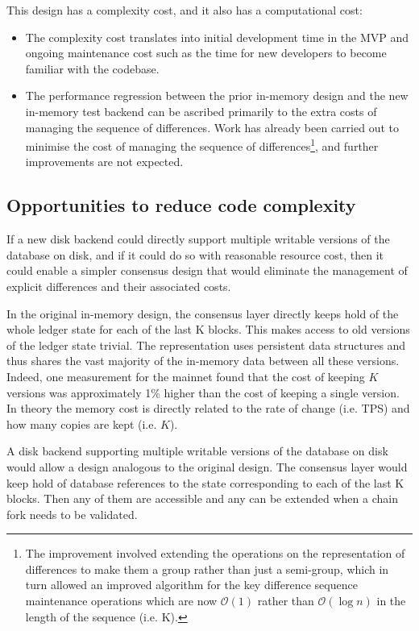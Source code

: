 \documentclass[11pt,a4paper]{article}
\begin{document}
This design has a complexity cost, and it also has a computational cost:
\begin{itemize}
\item The complexity cost translates into initial development time in the MVP
      and ongoing maintenance cost such as the time for new developers to
      become familiar with the codebase.
\item The performance regression between the prior in-memory design and the new
      in-memory test backend can be ascribed primarily to the extra costs of
      managing the sequence of differences. Work has already been carried out
      to minimise the cost of managing the sequence of differences\footnote{The
      improvement involved extending the operations on the representation of
      differences to make them a group rather than just a semi-group, which in
      turn allowed an improved algorithm for the key difference sequence
      maintenance operations which are now $\mathcal{O}(1)$ rather than
      $\mathcal{O}(\log n)$ in the length of the sequence (i.e. K).}, and
      further improvements are not expected.
\end{itemize}

\subsection{Opportunities to reduce code complexity}

If a new disk backend could directly support multiple writable versions of the
database on disk, and if it could do so with reasonable resource cost, then it
could enable a simpler consensus design that would eliminate the management of
explicit differences and their associated costs.

In the original in-memory design, the consensus layer directly keeps hold
of the whole ledger state for each of the last K blocks. This makes access to
old versions of the ledger state trivial. The representation uses persistent
data structures and thus shares the vast majority of the in-memory data between
all these versions. Indeed, one measurement for the mainnet found that the cost
of keeping $K$ versions was approximately 1\% higher than the cost of keeping a
single version. In theory the memory cost is directly related to the rate of
change (i.e. TPS) and how many copies are kept (i.e. $K$).

A disk backend supporting multiple writable versions of the database on disk
would allow a design analogous to the original design. The consensus layer
would keep hold of database references to the state corresponding to each of
the last K blocks. Then any of them are accessible and any can be extended
when a chain fork needs to be validated.
\end{document}
